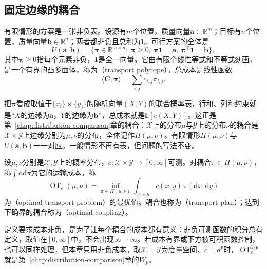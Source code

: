 \subsection{固定边缘的耦合}
\label{sec:ot-couplings}

有限情形的方案是一张非负表。设源有$m$个位置，质量向量$\bm{a}\in\mathbb{R}^{m}$；目标有$n$个位置，质量向量$\bm{b}\in\mathbb{R}^{n}$；两者都非负且总和为$1$。可行方案的全体是
\begin{equation}
 U(\bm{a},\bm{b})=\bigl\{\bm{\pi}\in\mathbb{R}^{m\times n}:\ \bm{\pi}\geq0,\ \bm{\pi}\bm{1}=\bm{a},\ \bm{\pi}^{\top}\bm{1}=\bm{b}\bigr\},
 \label{eq:ot-transport-polytope}
\end{equation}
其中$\bm{\pi}\geq0$指每个元素非负，$\bm{1}$是全一向量。它由有限个线性等式和不等式刻画，是一个有界的凸多面体，称为（transport polytope）。总成本是线性函数
\[
 \langle\bm{C},\bm{\pi}\rangle=\sum_{i,j}c_{i,j}\pi_{i,j} .
\]

把$\bm{\pi}$看成取值于$\{x_i\}\times\{y_j\}$的随机向量$(X,Y)$的联合概率表，行和、列和约束就是“$X$的边缘为$\bm{a}$，$Y$的边缘为$\bm{b}$”，总成本就是$\mathbb{E}[c(X,Y)]$。这正是第~\ref{chap:distribution-comparison}章的耦合：$\mathcal{X}$上的分布$\mu$与$\mathcal{Y}$上的分布$\nu$的耦合是$\mathcal{X}\times\mathcal{Y}$上边缘分别为$\mu,\nu$的分布，全体记作$\Pi(\mu,\nu)$。有限情形$\Pi(\mu,\nu)$与$U(\bm{a},\bm{b})$一一对应。一般情形不再有表，但问题的写法不变。

\begin{definition}[最优运输问题]
\label{def:ot-problem}
设$\mu,\nu$分别是$\mathcal{X},\mathcal{Y}$上的概率分布，$c:\mathcal{X}\times\mathcal{Y}\to[0,\infty]$可测。对耦合$\pi\in\Pi(\mu,\nu)$，称$\int c\,\mathrm{d}\pi$为它的运输成本。称
\begin{equation}
 \operatorname{OT}_c(\mu,\nu)=\inf_{\pi\in\Pi(\mu,\nu)}\int_{\mathcal{X}\times\mathcal{Y}}c(x,y)\,\pi(\mathrm{d}x,\mathrm{d}y)
 \label{eq:ot-kantorovich}
\end{equation}
为（optimal transport problem）的最优值。耦合也称为（transport plan）；达到下确界的耦合称为（optimal coupling）。
\end{definition}

定义要求成本非负，是为了让每个耦合的成本都有意义：非负可测函数的积分总有定义，取值在$[0,\infty]$中，不会出现$\infty-\infty$。若成本有界或下方被可积函数控制，也可以同样处理，但本章只用非负成本。取$\mathcal{X}=\mathcal{Y}$为度量空间、$c=d^{p}$时，$\operatorname{OT}_c^{1/p}$就是第~\ref{chap:distribution-comparison}章的$W_p$。

